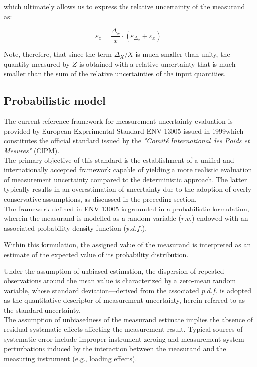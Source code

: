 \documentclass[../main.tex]{subfiles}
\begin{document}
which ultimately allows us to express the relative uncertainty of the measurand as:

\begin{equation}
	\varepsilon_z = \frac{\Delta_x}{x} \cdot (\varepsilon_{\Delta_x} + \varepsilon_x) 
\end{equation}

Note, therefore, that since the term $\Delta_X / X$ is much smaller than unity, the quantity measured by $Z$ is obtained with a relative uncertainty that is much smaller than the sum of the relative uncertainties of the input quantities.

\subsection{Probabilistic model}

The current reference framework for measurement uncertainty evaluation is provided by European Experimental Standard ENV 13005 issued in 1999which constitutes the official standard issued by the \textit{"Comité International des Poids et Mesures"} (CIPM).\\

The primary objective of this standard is the establishment of a unified and internationally accepted framework capable of yielding a more realistic evaluation of measurement uncertainty compared to the deterministic approach. The latter typically results in an overestimation of uncertainty due to the adoption of overly conservative assumptions, as discussed in the preceding section.\\

The framework defined in ENV 13005 is grounded in a probabilistic formulation, wherein the measurand is modelled as a random variable ($r.v.$) endowed with an associated probability density function ($p.d.f.$). 

Within this formulation, the assigned value of the measurand is interpreted as an estimate of the expected value of its probability distribution. 

Under the assumption of unbiased estimation, the dispersion of repeated observations around the mean value is characterized by a zero-mean random variable, whose standard deviation—derived from the associated $p.d.f.$ is adopted as the quantitative descriptor of measurement uncertainty, herein referred to as the standard uncertainty.\\

The assumption of unbiasedness of the measurand estimate implies the absence of residual systematic effects affecting the measurement result. Typical sources of systematic error include improper instrument zeroing and measurement system perturbations induced by the interaction between the measurand and the measuring instrument (e.g., loading effects).
\end{document}
